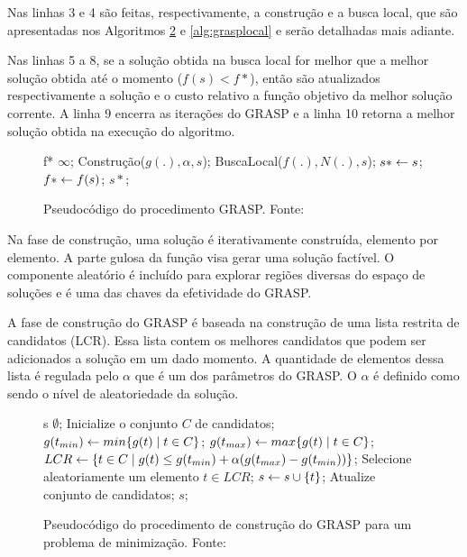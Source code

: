 Nas linhas 3 e 4 são feitas, respectivamente, a construção e a busca local, que
são apresentadas nos Algoritmos \ref{alg:graspcons} e \ref{alg:grasplocal} e serão
detalhadas mais adiante.

Nas linhas 5 a 8, se a solução obtida na busca local for melhor que a melhor
solução obtida até o momento ($f(s) < f{*}$), então são atualizados
respectivamente a solução e o custo relativo a função objetivo da melhor
solução corrente. A linha 9 encerra as iterações do GRASP e a linha 10 retorna a
melhor solução obtida na execução do algoritmo.

\begin{figure}[h]
\caption{Pseudocódigo do procedimento GRASP. \newline \mbox{Fonte:
\cite{resende1995}}}\label{alg:grasp}
\begin{programma}
\STATE f{*} \GETS $\infty$;
\STATE Construção($g(.), \alpha, s$);
\STATE BuscaLocal($f(.),N(.),s$);
\STATE $s{*} \leftarrow s$;
\STATE $f{*} \leftarrow f(s)$;
\ENDIF
\ENDFOR
\STATE\RETURN $s{*}$;
\ENDALGORITHM
\end{programma}
\end{figure}

Na fase de construção, uma solução é iterativamente construída, elemento por
elemento. A parte gulosa da função visa gerar uma solução factível. O
componente aleatório é incluído para explorar regiões diversas do espaço de
soluções e é uma das chaves da efetividade do GRASP.

A fase de construção do GRASP é baseada na construção de uma lista restrita de
candidatos (LCR). Essa lista contem os melhores candidatos que podem ser
adicionados a solução em um dado momento. A quantidade de elementos dessa lista
é regulada pelo $\alpha$ que é um dos parâmetros do GRASP. O $\alpha$ é
definido como sendo o nível de aleatoriedade da solução.

\begin{figure}[h]
\caption{Pseudocódigo do procedimento de construção do GRASP para um problema
de minimização. \newline \mbox{Fonte:
\cite{resende1995}}}\label{alg:graspcons}
\begin{programma}
\STATE s \GETS $\emptyset$;
\STATE Inicialize o conjunto $C$ de candidatos;
\STATE $g(t_{min}) \leftarrow min\{g(t) \mid t \in C\}$;
\STATE $g(t_{max}) \leftarrow max\{g(t) \mid t \in C\}$;
\STATE $LCR \leftarrow \{t \in C \mid g(t) \leq g(t_{min}) + \alpha(g(t_{max}) - g(t_{min}))\}$;
\STATE Selecione aleatoriamente um elemento $t \in LCR$;
\STATE $s \leftarrow s \cup \{t\}$;
\STATE Atualize conjunto de candidatos;
\ENDWHILE
\STATE\RETURN $s$;
\ENDALGORITHM
\end{programma}
\end{figure}

